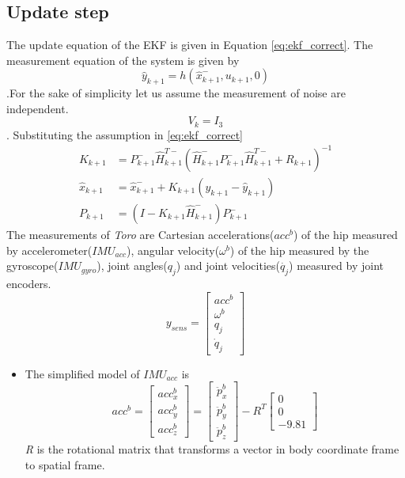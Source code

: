 \begin{enumerate}
\section{Update step}
The update equation of the EKF is given in Equation \ref{eq:ekf_correct}. The measurement equation of the system is given by $$\hat{y}_{k+1} = h(\hat{x}_{k+1}^-,u_{k+1},0)$$.For the sake of simplicity let us assume the measurement of noise are independent. $$V_k = I_3$$. Substituting the assumption in \ref{eq:ekf_correct}
\begin{equation}
\label{eq:correct}
\begin{split}
K_{k+1} &= P_{k+1}^-\hat{H}_{k+1}^{T-}(\hat{H}_{k+1}^-P_{k+1}^-\hat{H}_{k+1}^{T-} + R_{k+1})^{-1}\\
\hat{x}_{k+1} &= \hat{x}_{k+1}^- + K_{k+1}(y_{k+1}-\hat{y}_{k+1})\\
P_{k+1} &= (I- K_{k+1}\hat{H}_{k+1}^-)P_{k+1}^-
\end{split}
\end{equation}
The measurements of \emph{Toro} are Cartesian accelerations($acc^b$) of the hip measured by accelerometer($IMU_{acc}$), angular velocity($\omega^b$) of the hip measured by the gyroscope($IMU_{gyro}$), joint angles($q_j$) and joint velocities($\dot{q_j}$) measured by joint encoders.
\begin{equation}
    \label{eq:y_sens}
     y_{sens} = \begin{bmatrix} acc^b \\ \omega^b \\ q_j \\ \dot{q}_j \end{bmatrix} 
\end{equation}
\begin{itemize}
    \item The simplified model of $IMU_{acc}$ is $$ acc^b= \begin{bmatrix} acc^b_x \\ acc^b_y \\ acc^b_z \end{bmatrix} =  \begin{bmatrix}\ddot{p}_x^b \\ \ddot{p}_y^b \\ \ddot{p}_z^b \end{bmatrix} - R^T \begin{bmatrix}0 \\0 \\-9.81 \end{bmatrix}$$ \emph{R} is the rotational matrix that transforms a vector in body coordinate frame to spatial frame.

\end{itemize}
\end{enumerate}
